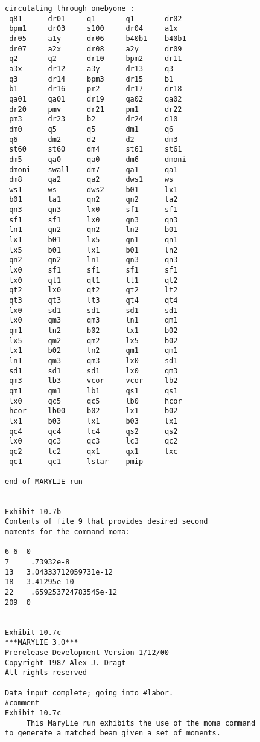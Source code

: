 \begin{footnotesize}
\begin{verbatim}
circulating through onebyone :
 q81      dr01     q1       q1       dr02
 bpm1     dr03     s100     dr04     a1x
 dr05     a1y      dr06     b40b1    b40b1
 dr07     a2x      dr08     a2y      dr09
 q2       q2       dr10     bpm2     dr11
 a3x      dr12     a3y      dr13     q3
 q3       dr14     bpm3     dr15     b1
 b1       dr16     pr2      dr17     dr18
 qa01     qa01     dr19     qa02     qa02
 dr20     pmv      dr21     pm1      dr22
 pm3      dr23     b2       dr24     d10
 dm0      q5       q5       dm1      q6
 q6       dm2      d2       d2       dm3
 st60     st60     dm4      st61     st61
 dm5      qa0      qa0      dm6      dmoni
 dmoni    swall    dm7      qa1      qa1
 dm8      qa2      qa2      dws1     ws
 ws1      ws       dws2     b01      lx1
 b01      la1      qn2      qn2      la2
 qn3      qn3      lx0      sf1      sf1
 sf1      sf1      lx0      qn3      qn3
 ln1      qn2      qn2      ln2      b01
 lx1      b01      lx5      qn1      qn1
 lx5      b01      lx1      b01      ln2
 qn2      qn2      ln1      qn3      qn3
 lx0      sf1      sf1      sf1      sf1
 lx0      qt1      qt1      lt1      qt2
 qt2      lx0      qt2      qt2      lt2
 qt3      qt3      lt3      qt4      qt4
 lx0      sd1      sd1      sd1      sd1
 lx0      qm3      qm3      ln1      qm1
 qm1      ln2      b02      lx1      b02
 lx5      qm2      qm2      lx5      b02
 lx1      b02      ln2      qm1      qm1
 ln1      qm3      qm3      lx0      sd1
 sd1      sd1      sd1      lx0      qm3
 qm3      lb3      vcor     vcor     lb2
 qm1      qm1      lb1      qs1      qs1
 lx0      qc5      qc5      lb0      hcor
 hcor     lb00     b02      lx1      b02
 lx1      b03      lx1      b03      lx1
 qc4      qc4      lc4      qs2      qs2
 lx0      qc3      qc3      lc3      qc2
 qc2      lc2      qx1      qx1      lxc
 qc1      qc1      lstar    pmip

end of MARYLIE run


Exhibit 10.7b
Contents of file 9 that provides desired second
moments for the command moma:

6 6  0
7     .73932e-8
13   3.04333712059731e-12
18   3.41295e-10
22    .659253724783545e-12
209  0


Exhibit 10.7c
***MARYLIE 3.0***
Prerelease Development Version 1/12/00
Copyright 1987 Alex J. Dragt
All rights reserved

Data input complete; going into #labor.
#comment
Exhibit 10.7c
     This MaryLie run exhibits the use of the moma command
to generate a matched beam given a set of moments.


\end{verbatim}
\end{footnotesize}
